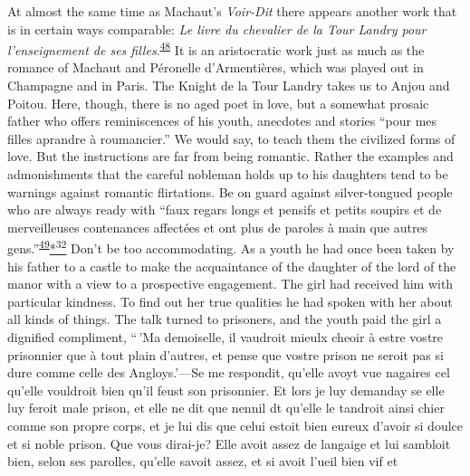 At almost the same time as Machaut's \emph{Voir-Dit} there appears
another work that is in certain ways comparable: \emph{Le livre du
chevalier de la Tour Landry pour l'enseignement de ses
filles}.\textsuperscript{\protect\hypertarget{11_Chapter_Four__THE_FORMS_OF_LOVE.xhtmlux5cux23id_1393}{\protect\hyperlink{23_NOTES.xhtmlux5cux23id_1394}{48}}}
It is an aristocratic work just as much as the romance of Machaut and
Péronelle d'Armentières, which was played out in Champagne and in Paris.
\protect\hypertarget{11_Chapter_Four__THE_FORMS_OF_LOVE.xhtmlux5cux23page_148}{}{}The
Knight de la Tour Landry takes us to Anjou and Poitou. Here, though,
there is no aged poet in love, but a somewhat prosaic father who offers
reminiscences of his youth, anecdotes and stories ``pour mes filles
aprandre à roumancier.'' We would say, to teach them the civilized forms
of love. But the instructions are far from being romantic. Rather the
examples and admonishments that the careful nobleman holds up to his
daughters tend to be warnings against romantic flirtations. Be on guard
against silver-tongued people who are always ready with ``faux regars
longs et pensifs et petits soupirs et de merveilleuses contenances
affectées et ont plus de paroles à main que autres
gens.''\textsuperscript{\protect\hypertarget{11_Chapter_Four__THE_FORMS_OF_LOVE.xhtmlux5cux23id_1391}{\protect\hyperlink{23_NOTES.xhtmlux5cux23id_1392}{49}}}\protect\hypertarget{11_Chapter_Four__THE_FORMS_OF_LOVE.xhtmlux5cux23id_3161}{\protect\hyperlink{23_NOTES.xhtmlux5cux23id_3162}{*\textsuperscript{32}}}
Don't be too accommodating. As a youth he had once been taken by his
father to a castle to make the acquaintance of the daughter of the lord
of the manor with a view to a prospective engagement. The girl had
received him with particular kindness. To find out her true qualities he
had spoken with her about all kinds of things. The talk turned to
prisoners, and the youth paid the girl a dignified compliment, ``\,'Ma
demoiselle, il vaudroit mieulx cheoir à estre vostre prisonnier que à
tout plain d'autres, et pense que vostre prison ne seroit pas si dure
comme celle des Angloys.'---Se me respondit, qu'elle avoyt vue nagaires
cel qu'elle vouldroit bien qu'il feust son prisonnier. Et lors je luy
demanday se elle luy feroit male prison, et elle ne dit que nennil dt
qu'elle le tandroit ainsi chier comme son propre corps, et je lui dis
que celui estoit bien eureux d'avoir si doulce et si noble prison. Que
vous dirai-je? Elle avoit assez de langaige et lui sambloit bien, selon
ses parolles, qu'elle savoit assez, et si avoit l'ueil bien vif et
